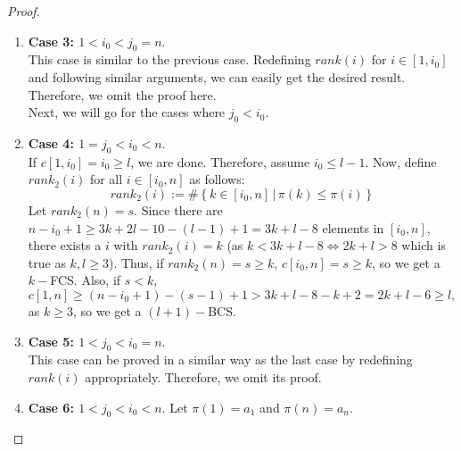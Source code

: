 \documentclass[11pt, a4paper]{article}
\theoremstyle{compact}
\begin{document}
\begin{proof}
\begin{enumerate}
     \[
       rank_2(i)  := \#  \left\{ k \in [j_0,n]\, \big| \, \pi(k) \leq \pi(i)  \right\} 
     \]
     Let $rank_2(n) = s$. Note that there are $n-j_0+1 \geq 3k + 2l-10 - (k-1) + 1 = 2k + 2l - 8$ elements in $[j_0,n]$. Therefore, if $s \geq k + l -4$ $\left(=\displaystyle \frac{1}{2}(2k + 2l -8)\right)$, 
     $$c[1,n] \geq s + 1 \geq k + l -3 \geq k,$$
     as $l \geq 3$. 
     On the other hand, if $s < k + l -4$, 
     \[
      c[j_0, n] = (n-j_0+1) - (s-1) > 2k + 2l - 8 - (k + l - 4 - 1) = k + l - 3 \geq l,
     \] as $k \geq 3$. \\
     (Observe that in the definition of $rank_2(i)$, $\pi(1)=1$ is not counted.) \\
     Therefore, we are done in both cases.     
\item     \textbf{Case 3: $1<i_0<j_0=n$}. \\
     This case is similar to the previous case. Redefining $rank(i)$ for $i \in [1, i_0]$ and following similar arguments, we can easily get the desired result. Therefore, we omit the proof here. \\
     Next, we will go for the cases where $j_0< i_0$. 
\item    \textbf{Case 4: $1=j_0 < i_0 < n$}. \\
     If $c[1, i_0] = i_0 \geq l$, we are done. Therefore, assume $i_0 \leq l-1$. Now, define $rank_2(i)$ for all $i \in [i_0,n]$ as follows:
     \[
     rank_2(i)  := \#  \left\{ k \in [i_0,n]\, \big| \, \pi(k) \leq \pi(i)  \right\} 
     \]
     Let $rank_2(n) = s$. Since there are $n-i_0+1 \geq 3k + 2l -10 - (l-1) + 1 = 3k + l - 8$ elements in $[i_0, n]$, there exists a $i$ with $rank_2(i) = k$ (as $k < 3k + l - 8 \iff 2k + l  > 8$ which is true as $k, l \geq 3$). Thus, if $rank_2(n) = s \geq k$, $c[i_0,n] = s \geq k $, so we get a $k-$FCS. Also, if $s < k$, 
     \[
     c[1, n] \geq (n - i_0+1) - (s-1) + 1 > 3k + l - 8 - k + 2 = 2k + l - 6 \geq l,
     \]
    as $k \geq 3$, so we get a $(l+1)-$BCS.
\item     \textbf{Case 5: $1<j_0<i_0=n$}. \\
    This case can be proved in a similar way as the last case by redefining $rank(i)$ appropriately. Therefore, we omit its proof. 
\item    \textbf{Case 6: $1<j_0<i_0<n$}.     Let $\pi(1) = a_1$ and $\pi(n) = a_n$. \\


\end{enumerate}
\end{proof}
\end{document}

